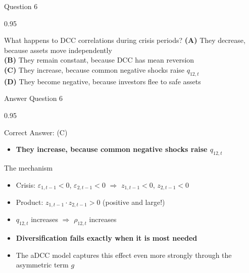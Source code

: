 \documentclass[9pt, aspectratio=169, t]{beamer}
\begin{document}
\begin{frame}{Question 6}
    \begin{cminipage}{0.95\textwidth}
    \begin{block}{What happens to DCC correlations during crisis periods?}
        \textcolor{MainBlue}{\textbf{(A)}} They decrease, because assets move independently\\[3pt]
        \textcolor{MainBlue}{\textbf{(B)}} They remain constant, because DCC has mean reversion\\[3pt]
        \textcolor{MainBlue}{\textbf{(C)}} They increase, because common negative shocks raise $q_{12,t}$\\[3pt]
        \textcolor{MainBlue}{\textbf{(D)}} They become negative, because investors flee to safe assets
    \end{block}
    \end{cminipage}
\end{frame}

\begin{frame}{Answer Question 6}
    \begin{cminipage}{0.95\textwidth}
    \begin{exampleblock}{Correct Answer: (C)}
        \begin{itemize}\setlength{\itemsep}{0pt}
            \item \textbf{They increase, because common negative shocks raise $q_{12,t}$}
        \end{itemize}
    \end{exampleblock}

    \pause
    \begin{block}{The mechanism}
        \begin{itemize}\setlength{\itemsep}{0pt}
            \item Crisis: $\varepsilon_{1,t-1} < 0$, $\varepsilon_{2,t-1} < 0$ $\Rightarrow$ $z_{1,t-1} < 0$, $z_{2,t-1} < 0$
            \item Product: $z_{1,t-1} \cdot z_{2,t-1} > 0$ (positive and large!)
            \item $q_{12,t}$ increases $\Rightarrow$ $\rho_{12,t}$ increases
            \item \textbf{Diversification fails exactly when it is most needed}
            \item The aDCC model captures this effect even more strongly through the asymmetric term $g$
        \end{itemize}
    \end{block}
    \end{cminipage}
\end{frame}
\end{document}
